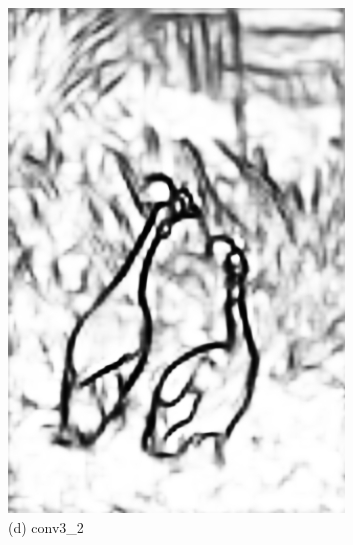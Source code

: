 \documentclass[CJK,aspectratio=169]{beamer}  %
\begin{document}
\begin{frame}
\begin{figure}
\begin{minipage}{0.11\columnwidth}
				\includegraphics[width=\linewidth]{picture/LLIE/RCF/conv3_2}
				\caption*{\tiny (d) conv3\_2}
				\label{fig: conv3_2}	
			\end{minipage}
			\begin{minipage}{0.11\columnwidth}

\end{minipage}
\end{figure}
\end{frame}
\end{document}
